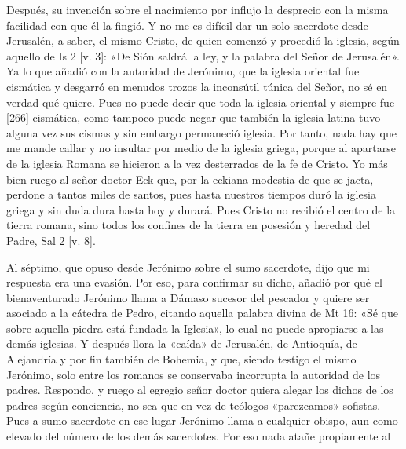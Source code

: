 Después, su invención sobre el nacimiento por influjo la desprecio con la misma facilidad con que él la fingió. Y no me es difícil dar un solo sacerdote desde Jerusalén, a saber, el mismo Cristo, de quien comenzó y procedió la iglesia, según aquello de Is 2 [v. 3]: «De Sión saldrá la ley, y la palabra del Señor de Jerusalén». Ya lo que añadió con la autoridad de Jerónimo, que la iglesia oriental fue cismática y desgarró en menudos trozos la inconsútil túnica del Señor, no sé en verdad qué quiere. Pues no puede decir que toda la iglesia oriental y siempre fue [266] cismática, como tampoco puede negar que también la iglesia latina tuvo alguna vez sus cismas y sin embargo permaneció iglesia. Por tanto, nada hay que me mande callar y no insultar por medio de la iglesia griega, porque al apartarse de la iglesia Romana se hicieron a la vez desterrados de la fe de Cristo. Yo más bien ruego al señor doctor Eck que, por la eckiana modestia de que se jacta, perdone a tantos miles de santos, pues hasta nuestros tiempos duró la iglesia griega y sin duda dura hasta hoy y durará. Pues Cristo no recibió el centro de la tierra romana, sino todos los confines de la tierra en posesión y heredad del Padre, Sal 2 [v. 8].

Al séptimo, que opuso desde Jerónimo sobre el sumo sacerdote, dijo que mi respuesta era una evasión. Por eso, para confirmar su dicho, añadió por qué el bienaventurado Jerónimo llama a Dámaso sucesor del pescador y quiere ser asociado a la cátedra de Pedro, citando aquella palabra divina de Mt 16: «Sé que sobre aquella piedra está fundada la Iglesia», lo cual no puede apropiarse a las demás iglesias. Y después llora la «caída» de Jerusalén, de Antioquía, de Alejandría y por fin también de Bohemia, y que, siendo testigo el mismo Jerónimo, solo entre los romanos se conservaba incorrupta la autoridad de los padres. Respondo, y ruego al egregio señor doctor quiera alegar los dichos de los padres según conciencia, no sea que en vez de teólogos «parezcamos» sofistas. Pues a sumo sacerdote en ese lugar Jerónimo llama a cualquier obispo, aun como elevado del número de los demás sacerdotes. Por eso nada atañe propiamente al

